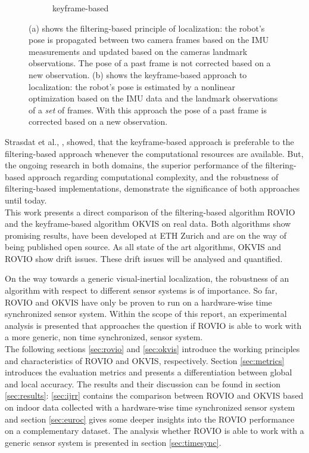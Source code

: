 \begin{figure}
\begin{subfigure}[b]{0.4\textwidth}
    \caption{keyframe-based}
    \label{fig:2}
  \end{subfigure}
\caption{(a) shows the filtering-based principle of localization: the robot's pose is propagated between two camera frames based on the IMU measurements and updated based on the cameras landmark observations. The pose of a past frame is not corrected based on a new observation. (b) shows the keyframe-based approach to localization: the robot's pose is estimated by a nonlinear optimization based on the IMU data and the landmark observations of a \textit{set} of frames. With this approach the pose of a past frame is corrected based on a new observation.}
\label{pics:filtering_keyframe}
\end{figure}

Strasdat et al., \cite{strasdat2010real}, showed, that the keyframe-based approach is preferable to the filtering-based approach whenever the computational resources are available. But, the ongoing research in both domains, the superior performance of the filtering-based approach regarding computational complexity, and the robustness of filtering-based implementations, demonstrate the significance of both approaches until today. \\

This work presents a direct comparison of the filtering-based algorithm ROVIO and the keyframe-based algorithm OKVIS on real data. Both algorithms show promising results, have been developed at ETH Zurich and are on the way of being published open source. As all state of the art algorithms, OKVIS and ROVIO show drift issues. These drift issues will be analysed and quantified. 

On the way towards a generic visual-inertial localization, the robustness of an algorithm with respect to different sensor systems is of importance. So far, ROVIO and OKVIS have only be proven to run on a hardware-wise time synchronized sensor system. Within the scope of this report, an experimental analysis is presented that approaches the question if ROVIO is able to work with a more generic, non time synchronized, sensor system. \\

The following sections \ref{sec:rovio} and \ref{sec:okvis} introduce the working principles and characteristics of ROVIO and OKVIS, respectively. Section \ref{sec:metrics} introduces the evaluation metrics and presents a differentiation between global and local accuracy. The results and their discussion can be found in section \ref{sec:results}: \ref{sec:ijrr} contains the comparison between ROVIO and OKVIS based on indoor data collected with a hardware-wise time synchronized sensor system and section \ref{sec:euroc} gives some deeper insights into the ROVIO performance on a complementary dataset. The analysis whether ROVIO is able to work with a generic sensor system is presented in section \ref{sec:timesync}. \\
